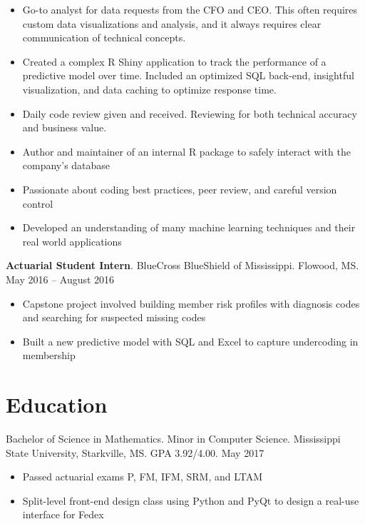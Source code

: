 \documentclass[11pt, a4paper]{awesome-cv}
\begin{document}
\begin{itemize}
\item
  Go-to analyst for data requests from the CFO and CEO. This often requires custom data visualizations and analysis, and it always requires clear communication of technical concepts.
\item
  Created a complex R Shiny application to track the performance of a predictive model over time. Included an optimized SQL back-end, insightful visualization, and data caching to optimize response time.
\item
  Daily code review given and received. Reviewing for both technical accuracy and business value.
\item
  Author and maintainer of an internal R package to safely interact with the company's database
\item
  Passionate about coding best practices, peer review, and careful version control
\item
  Developed an understanding of many machine learning techniques and their real world applications
\end{itemize}

\textbf{Actuarial Student Intern}. BlueCross BlueShield of Mississippi. Flowood, MS. May 2016 -- August 2016

\begin{itemize}
\item
  Capstone project involved building member risk profiles with diagnosis codes and searching for suspected missing codes
\item
  Built a new predictive model with SQL and Excel to capture undercoding in membership
\end{itemize}

\hypertarget{education}{%
\section{Education}\label{education}}

Bachelor of Science in Mathematics. Minor in Computer Science. Mississippi State University, Starkville, MS. GPA 3.92/4.00. May 2017

\begin{itemize}
\item
  Passed actuarial exams P, FM, IFM, SRM, and LTAM
\item
  Split-level front-end design class using Python and PyQt to design a real-use interface for Fedex
\end{itemize}
\end{document}
